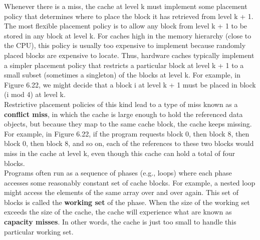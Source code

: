 \documentclass[11pt]{article}
\begin{document}
\begin{enumerate}
Whenever there is a miss, the cache at level k must implement some placement policy that determines where to place the block it has retrieved from level k + 1. The most flexible placement policy is to allow any block from level k + 1 to be stored in any block at level k. For caches high in the memory hierarchy (close to the CPU), this policy is usually too expensive to implement because randomly placed blocks are expensive to locate. Thus, hardware caches typically implement a simpler placement policy that restricts a particular block at level k + 1 to a small subset (sometimes a singleton) of the blocks at level k. For example, in Figure 6.22, we might decide that a block i at level k + 1 must be placed in block (i mod 4) at level k.\\


Restrictive placement policies of this kind lead to a type of miss known as a \textbf{conflict miss}, in which the cache is large enough to hold the referenced data objects, but because they map to the same cache block, the cache keeps missing. For example, in Figure 6.22, if the program requests block 0, then block 8, then block 0, then block 8, and so on, each of the references to these two blocks would miss in the cache at level k, even though this cache can hold a total of four blocks.\\


Programs often run as a sequence of phases (e.g., loops) where each phase accesses some reasonably constant set of cache blocks. For example, a nested loop might access the elements of the same array over and over again. This set of blocks is called the \textbf{working set} of the phase. When the size of the working set exceeds the size of the cache, the cache will experience what are known as \textbf{capacity misses}. In other words, the cache is just too small to handle this particular working set.\\
\end{enumerate}
\end{document}
